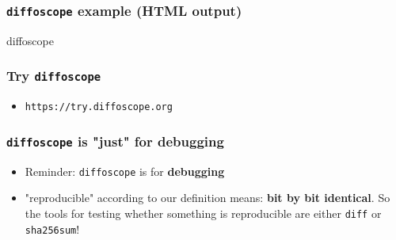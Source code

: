 \documentclass[14pt,aspectratio=169]{beamer}
\newif\ifplacelogo
\begin{document}
{\begin{frame}
 \frametitle{\texttt{diffoscope} example (HTML output)}
\end{frame}


\begin{frame}{diffoscope}
 \frametitle{Try \texttt{diffoscope}}
 \begin{itemize}
  \item \texttt{https://try.diffoscope.org}
 \end{itemize}
\end{frame}



\begin{frame}
 \frametitle{\texttt{diffoscope} is "just" for debugging}

 \begin{itemize}
  \item Reminder: \texttt{diffoscope} is for \textbf{debugging}
  \item<2> "reproducible" according to our definition means: \textbf{bit by bit
  identical}. So the tools for testing whether something is reproducible are
  either \texttt{diff} or \texttt{sha256sum}!
 \end{itemize}
\end{frame}

}

\placelogotrue
\end{document}
